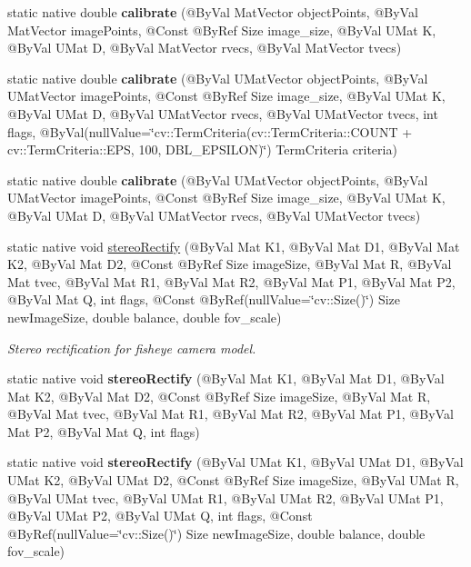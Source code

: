 \begin{DoxyCompactItemize}
\item 
static native double {\bfseries calibrate} (@By\+Val Mat\+Vector object\+Points, @By\+Val Mat\+Vector image\+Points, @Const @By\+Ref Size image\+\_\+size, @By\+Val U\+Mat K, @By\+Val U\+Mat D, @By\+Val Mat\+Vector rvecs, @By\+Val Mat\+Vector tvecs)
\item 
static native double {\bfseries calibrate} (@By\+Val U\+Mat\+Vector object\+Points, @By\+Val U\+Mat\+Vector image\+Points, @Const @By\+Ref Size image\+\_\+size, @By\+Val U\+Mat K, @By\+Val U\+Mat D, @By\+Val U\+Mat\+Vector rvecs, @By\+Val U\+Mat\+Vector tvecs, int flags, @By\+Val(null\+Value=\char`\"{}cv\+::\+Term\+Criteria(cv\+::\+Term\+Criteria\+::\+C\+O\+U\+NT + cv\+::\+Term\+Criteria\+::\+E\+PS, 100, D\+B\+L\+\_\+\+E\+P\+S\+I\+L\+ON)\char`\"{}) Term\+Criteria criteria)
\item 
static native double {\bfseries calibrate} (@By\+Val U\+Mat\+Vector object\+Points, @By\+Val U\+Mat\+Vector image\+Points, @Const @By\+Ref Size image\+\_\+size, @By\+Val U\+Mat K, @By\+Val U\+Mat D, @By\+Val U\+Mat\+Vector rvecs, @By\+Val U\+Mat\+Vector tvecs)
\item 
static native void \hyperlink{group__calib3d__fisheye_ga8733df626f7839fe698cc024f4836938}{stereo\+Rectify} (@By\+Val Mat K1, @By\+Val Mat D1, @By\+Val Mat K2, @By\+Val Mat D2, @Const @By\+Ref Size image\+Size, @By\+Val Mat R, @By\+Val Mat tvec, @By\+Val Mat R1, @By\+Val Mat R2, @By\+Val Mat P1, @By\+Val Mat P2, @By\+Val Mat Q, int flags, @Const @By\+Ref(null\+Value=\char`\"{}cv\+::\+Size()\char`\"{}) Size new\+Image\+Size, double balance, double fov\+\_\+scale)
\begin{DoxyCompactList}\small\item\em Stereo rectification for fisheye camera model. \end{DoxyCompactList}\item 
static native void {\bfseries stereo\+Rectify} (@By\+Val Mat K1, @By\+Val Mat D1, @By\+Val Mat K2, @By\+Val Mat D2, @Const @By\+Ref Size image\+Size, @By\+Val Mat R, @By\+Val Mat tvec, @By\+Val Mat R1, @By\+Val Mat R2, @By\+Val Mat P1, @By\+Val Mat P2, @By\+Val Mat Q, int flags)
\item 
static native void {\bfseries stereo\+Rectify} (@By\+Val U\+Mat K1, @By\+Val U\+Mat D1, @By\+Val U\+Mat K2, @By\+Val U\+Mat D2, @Const @By\+Ref Size image\+Size, @By\+Val U\+Mat R, @By\+Val U\+Mat tvec, @By\+Val U\+Mat R1, @By\+Val U\+Mat R2, @By\+Val U\+Mat P1, @By\+Val U\+Mat P2, @By\+Val U\+Mat Q, int flags, @Const @By\+Ref(null\+Value=\char`\"{}cv\+::\+Size()\char`\"{}) Size new\+Image\+Size, double balance, double fov\+\_\+scale)

\end{DoxyCompactItemize}
